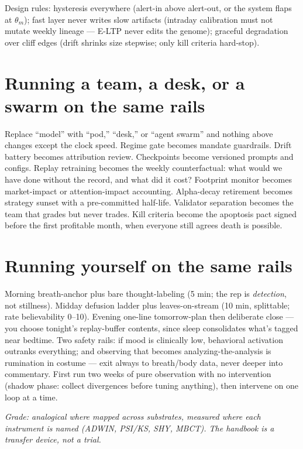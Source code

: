 Design rules: hysteresis everywhere (alert-in above alert-out, or the system flaps at $\theta_m$); fast layer never writes slow artifacts (intraday calibration must not mutate weekly lineage --- E-LTP never edits the genome); graceful degradation over cliff edges (drift shrinks size stepwise; only kill criteria hard-stop).

\section{Running a team, a desk, or a swarm on the same rails}

Replace ``model'' with ``pod,'' ``desk,'' or ``agent swarm'' and nothing above changes except the clock speed. Regime gate becomes mandate guardrails. Drift battery becomes attribution review. Checkpoints become versioned prompts and configs. Replay retraining becomes the weekly counterfactual: what would we have done without the record, and what did it cost? Footprint monitor becomes market-impact or attention-impact accounting. Alpha-decay retirement becomes strategy sunset with a pre-committed half-life. Validator separation becomes the team that grades but never trades. Kill criteria become the apoptosis pact signed before the first profitable month, when everyone still agrees death is possible.

\section{Running yourself on the same rails}

Morning breath-anchor plus bare thought-labeling (5 min; the rep is \textit{detection}, not stillness). Midday defusion ladder plus leaves-on-stream (10 min, splittable; rate believability 0--10). Evening one-line tomorrow-plan then deliberate close --- you choose tonight's replay-buffer contents, since sleep consolidates what's tagged near bedtime. Two safety rails: if mood is clinically low, behavioral activation outranks everything; and observing that becomes analyzing-the-analysis is rumination in costume --- exit always to breath/body data, never deeper into commentary. First run two weeks of pure observation with no intervention (shadow phase: collect divergences before tuning anything), then intervene on one loop at a time.

\textit{Grade: analogical where mapped across substrates, measured where each instrument is named (ADWIN, PSI/KS, SHY, MBCT). The handbook is a transfer device, not a trial.}
